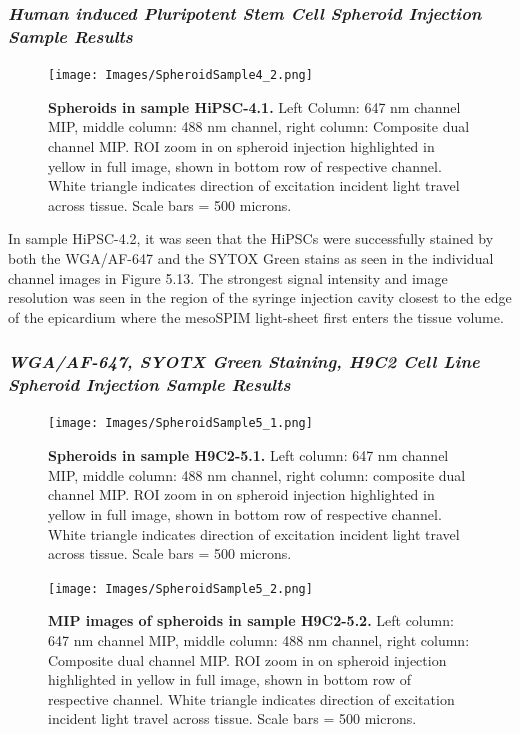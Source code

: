 \subsubsection{\textit{Human induced Pluripotent Stem Cell Spheroid Injection Sample Results}}


\begin{figure}[H]
\centering
\texttt{[image: Images/SpheroidSample4\_2.png]}
\caption{\textbf{Spheroids in sample HiPSC-4.1.} Left Column: 647 nm channel MIP, middle column: 488 nm channel, right column: Composite dual channel MIP. ROI zoom in on spheroid injection highlighted in yellow in full image, shown in bottom row of respective channel. White triangle indicates direction of excitation incident light travel across tissue. Scale bars = 500 microns.}
\label{spheroids4.2}
\end{figure}

In sample HiPSC-4.2, it was seen that the HiPSCs were successfully stained by both the WGA/AF-647 and the SYTOX Green stains as seen in the individual channel images in Figure 5.13. The strongest signal intensity and image resolution was seen in the region of the syringe injection cavity closest to the edge of the epicardium where the mesoSPIM light-sheet first enters the tissue volume.

\subsubsection{\textit{WGA/AF-647, SYOTX Green Staining, H9C2 Cell Line Spheroid Injection Sample Results}}

\begin{figure}[H]
\centering
\texttt{[image: Images/SpheroidSample5\_1.png]}
\caption{\textbf{Spheroids in sample H9C2-5.1.}  Left column: 647 nm channel MIP, middle column: 488 nm channel, right column: composite dual channel MIP. ROI zoom in on spheroid injection highlighted in yellow in full image, shown in bottom row of respective channel. White triangle indicates direction of excitation incident light travel across tissue.  Scale bars = 500 microns.}
\label{fig:enter-label}
\end{figure}
\medskip

\begin{figure}[H]
\centering
\texttt{[image: Images/SpheroidSample5\_2.png]}
\caption{\textbf{MIP images of spheroids in sample H9C2-5.2.} Left column: 647 nm channel MIP, middle column: 488 nm channel, right column: Composite dual channel MIP. ROI zoom in on spheroid injection highlighted in yellow in full image, shown in bottom row of respective channel. White triangle indicates direction of excitation incident light travel across tissue. Scale bars = 500 microns.}
\label{fig:enter-label}
\end{figure}
\medskip

